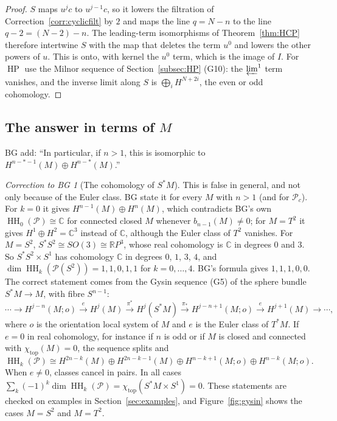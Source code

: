 \documentclass[11pt,oneside,reqno]{article}
\DeclareMathOperator{\HH}{HH}
\DeclareMathOperator{\HP}{HP}
\newcommand{\C}{\mathbb C}
\newcommand{\R}{\mathbb R}
\newcommand{\cP}{\mathcal P}
\theoremstyle{plain}
\theoremstyle{definition}
\theoremstyle{remark}
\newtheorem{correction}[theorem]{Correction to BG}
\begin{document}
\begin{proof}
\(S\) maps \(u^jc\) to \(u^{j-1}c\), so it lowers the filtration of
Correction~\ref{corr:cyclicfilt} by \(2\) and maps the line \(q=N-n\) to the line
\(q-2=(N-2)-n\). The leading-term isomorphisms of Theorem~\ref{thm:HCP}
therefore intertwine \(S\) with the map that deletes the term \(u^0\) and lowers the
other powers of \(u\). This is onto, with kernel the \(u^0\) term, which is the image of
\(I\). For \(\HP\) use the Milnor sequence of Section~\ref{subsec:HP} (G10): the
\(\varprojlim^1\) term vanishes, and the inverse limit along \(S\) is
\(\bigoplus_iH^{N+2i}\), the even or odd cohomology.
\end{proof}

\subsection{The answer in terms of \texorpdfstring{\(M\)}{M}}\label{subsec:gysin}
BG add: ``In particular, if \(n>1\), this is isomorphic to
\(H^{n-*-1}(M)\oplus H^{n-*}(M)\).''

\begin{correction}[The cohomology of \(S^*M\)]\label{corr:gysin}
This is false in general, and not only because of the Euler class. BG state it for
every \(M\) with \(n>1\) (and for \(\cP_c\)). For \(k=0\) it gives
\(H^{n-1}(M)\oplus H^n(M)\), which contradicts BG's own \(\HH_0(\cP)\cong\C\) for connected
closed \(M\) whenever \(b_{n-1}(M)\ne0\); for \(M=T^2\) it gives \(H^1\oplus H^2=\C^3\) instead of
\(\C\), although the Euler class of \(T^2\) vanishes. For \(M=S^2\), \(S^*S^2\cong SO(3)\cong\R P^3\), whose real
cohomology is \(\C\) in degrees \(0\) and \(3\). So \(S^*S^2\times S^1\) has cohomology \(\C\) in degrees
\(0\), \(1\), \(3\), \(4\), and \(\dim\HH_k(\cP(S^2))=1,1,0,1,1\) for \(k=0,\dots,4\). BG's formula gives
\(1,1,1,0,0\). The correct statement comes from the Gysin sequence (G5) of the
sphere bundle \(S^*M\to M\), with fibre \(S^{n-1}\):
\[
 \cdots\to H^{j-n}(M;o)\xrightarrow{\ e\ }H^j(M)\xrightarrow{\pi^*}H^j(S^*M)\xrightarrow{\pi_*}
 H^{j-n+1}(M;o)\xrightarrow{\ e\ }H^{j+1}(M)\to\cdots,
\]
where \(o\) is the orientation local system of \(M\) and \(e\) is the Euler class of \(T^*M\).
If \(e=0\) in real cohomology, for instance if \(n\) is odd or if \(M\) is closed and
connected with \(\chi_{\mathrm{top}}(M)=0\), the sequence splits and
\[
 \HH_k(\cP)\cong H^{2n-k}(M)\oplus H^{2n-k-1}(M)\oplus H^{n-k+1}(M;o)\oplus H^{n-k}(M;o).
\]
When \(e\ne0\), classes cancel in pairs. In all cases
\(\sum_k(-1)^k\dim\HH_k(\cP)=\chi_{\mathrm{top}}(S^*M\times S^1)=0\). These statements are checked on
examples in Section~\ref{sec:examples}, and Figure~\ref{fig:gysin} shows the
cases \(M=S^2\) and \(M=T^2\).
\end{correction}
\end{document}
